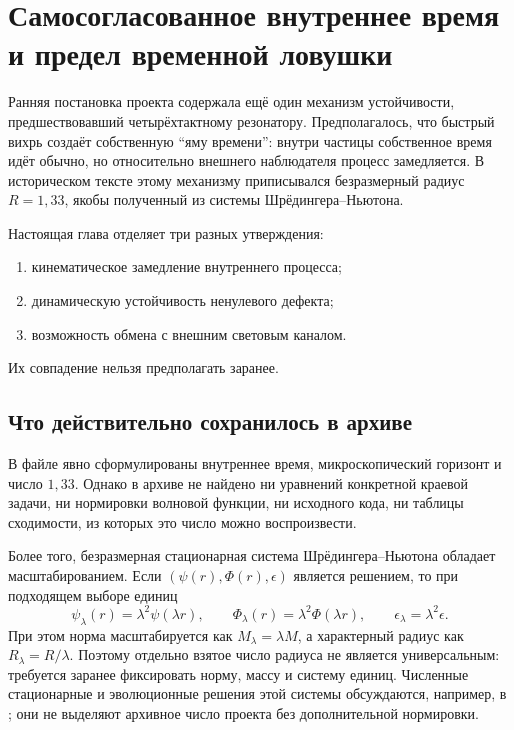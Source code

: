 \chapter{Самосогласованное внутреннее время и предел временной ловушки}

Ранняя постановка проекта содержала ещё один механизм устойчивости,
предшествовавший четырёхтактному резонатору. Предполагалось, что быстрый
вихрь создаёт собственную ``яму времени'': внутри частицы собственное время
идёт обычно, но относительно внешнего наблюдателя процесс замедляется.
В историческом тексте этому механизму приписывался безразмерный радиус
$R=1{,}33$, якобы полученный из системы Шрёдингера--Ньютона.

Настоящая глава отделяет три разных утверждения:
\begin{enumerate}
 \item кинематическое замедление внутреннего процесса;
 \item динамическую устойчивость ненулевого дефекта;
 \item возможность обмена с внешним световым каналом.
\end{enumerate}
Их совпадение нельзя предполагать заранее.

\section{Что действительно сохранилось в архиве}

В файле
явно сформулированы внутреннее время, микроскопический горизонт и число
$1{,}33$. Однако в архиве не найдено ни уравнений конкретной краевой задачи,
ни нормировки волновой функции, ни исходного кода, ни таблицы сходимости,
из которых это число можно воспроизвести.

Более того, безразмерная стационарная система Шрёдингера--Ньютона обладает
масштабированием. Если $(\psi(r),\Phi(r),\epsilon)$ является решением, то
при подходящем выборе единиц
\begin{equation}
 \psi_\lambda(r)=\lambda^2\psi(\lambda r),\qquad
 \Phi_\lambda(r)=\lambda^2\Phi(\lambda r),\qquad
 \epsilon_\lambda=\lambda^2\epsilon.
 \label{eq:v5-sn-scaling}
\end{equation}
При этом норма масштабируется как $M_\lambda=\lambda M$, а характерный
радиус как $R_\lambda=R/\lambda$. Поэтому отдельно взятое число радиуса не
является универсальным: требуется заранее фиксировать норму, массу и
систему единиц. Численные стационарные и эволюционные решения этой системы
обсуждаются, например, в ; они не выделяют
архивное число проекта без дополнительной нормировки.

